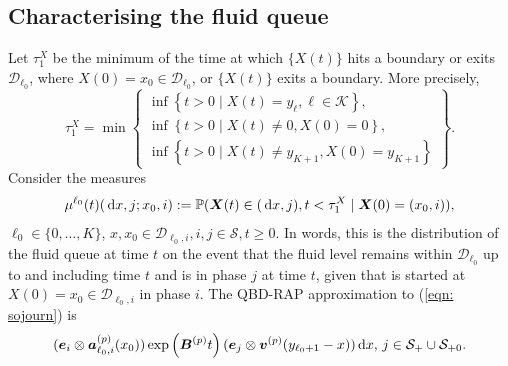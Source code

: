 \subsection{Characterising the fluid queue}
Let \(\tau_1^X\) be the minimum of the time at which \(\{X(t)\}\) hits a boundary or exits \(\mathcal D_{\ell_0}\), where \(X(0)=x_0\in\mathcal D_{\ell_0}\), or \(\{X(t)\}\) exits a boundary. More precisely, 
\[\tau_1^X = \min\left\{\begin{array}{c}\inf\left\{t>0\mid X(t)=y_{\ell}, \ell\in\mathcal K\right\}, \\ \inf\left\{t>0 \mid X(t) \neq 0, X(0)=0\right\}, \\ \inf\left\{t>0 \mid X(t) \neq y_{K+1}, X(0)=y_{K+1}\right\} \end{array} \right\}.\]
Consider the measures 
\begin{align}\label{eqn: sojourn}
	\mu^{\ell_0}(t)(\, \mathrm{d} x,j; x_0,i) := \mathbb P(\boldsymbol X(t)\in (\, \mathrm{d} x,j), t<\tau_1^X \mid \boldsymbol X(0) = (x_0, i)),
\end{align}
\(\ell_0\in\{0,\dots,K\}\), \(x,x_0 \in\mathcal D_{\ell_0,i}, i,j\in\mathcal S, t \geq 0. \)
In words, this is the distribution of the fluid queue at time \(t\) on the event that the fluid level remains within \(\mathcal D_{\ell_0}\) up to and including time \(t\) and is in phase \(j\) at time \(t\), given that is started at \(X(0)=x_0\in\mathcal D_{\ell_0,i}\) in phase \(i\). The QBD-RAP approximation to (\ref{eqn: sojourn}) is 
\begin{align}
	(\boldsymbol e_i\otimes \boldsymbol  a_{\ell_0,i}^{(p)}(x_0)) \exp\left(\boldsymbol{B}^{(p)}t\right)(\boldsymbol e_j \otimes {\boldsymbol v}^{(p)}(y_{\ell_0+1}-x))\, \mathrm{d} x,\,j\in\mathcal{S}_+\cup\mathcal{S}_{+0}. \label{eqn: ldll}
\end{align}
